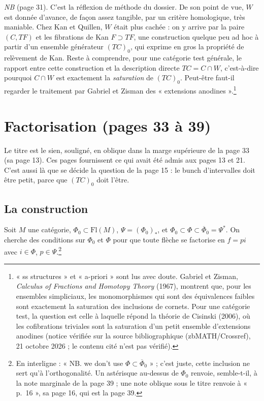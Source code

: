 \documentclass[11pt,a4paper]{article}
\begin{document}
\emph{NB} (page 31). C'est la réflexion de méthode du dossier. De son point de vue, $W$ est donnée d'avance, de façon assez
tangible, par un critère homologique, très maniable. Chez Kan et Quillen, $W$
était plus cachée : on y arrive par la paire $(C, TF)$ et les fibrations de
Kan $F \supset TF$, une construction quelque peu ad hoc à partir d'un ensemble
générateur $(TC)_0$, qui exprime en gros la propriété de relèvement de Kan.
Reste à comprendre, pour une catégorie test générale, le rapport entre cette
construction et la description directe $TC = C \cap W$, c'est-à-dire pourquoi
$C \cap W$ est exactement la \emph{saturation} de $(TC)_0$. Peut-être faut-il
regarder le traitement par Gabriel et Zisman des « extensions
anodines ».\footnote{« ss structures » et « a-priori » sont lus avec doute.
Gabriel et Zisman, \emph{Calculus of Fractions and Homotopy Theory} (1967),
montrent que, pour les ensembles simpliciaux, les monomorphismes qui sont des
équivalences faibles sont exactement la saturation des inclusions de cornets.
Pour une catégorie test, la question est celle à laquelle répond la théorie de
Cisinski (2006), où les cofibrations triviales sont la saturation d'un petit
ensemble d'extensions anodines (notice vérifiée sur la source bibliographique (zbMATH/Crossref), 21 octobre 2026 ; le contenu cité n'est pas vérifié).}

\section*{Factorisation (pages 33 à 39)}

Le titre est le sien, souligné, en oblique dans la marge supérieure de la page
33 (sa page 13). Ces pages fournissent ce qui avait été admis aux pages 13 et
21. C'est aussi là que se décide la question de la page 15 : le bunch
d'intervalles doit être petit, parce que $(TC)_0$ doit l'être.

\subsection*{La construction}

Soit $M$ une catégorie, $\Phi_0 \subset \mathrm{Fl}(M)$, $\Psi = (\Phi_0)_*$,
et $\Phi_0 \subset \Phi \subset \overline{\Phi}_0 = \Psi^*$. On cherche des
conditions sur $\Phi_0$ et $\Phi$ pour que toute flèche se factorise en
$f = pi$ avec $i \in \Phi$, $p \in \Psi$.\footnote{En interligne : « NB. we
don't use $\Phi \subset \overline{\Phi}_0$ » ; c'est juste, cette inclusion ne
sert qu'à l'orthogonalité. Un astérisque au-dessus de $\Phi_0$ renvoie,
semble-t-il, à la note marginale de la page 39 ; une note oblique sous le titre
renvoie à « p.~16 », sa page 16, qui est la page 39.}
\end{document}
